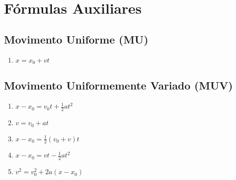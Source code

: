 \documentclass[12pt,a4paper,oneside]{article}
\begin{document}
\section{Fórmulas Auxiliares}

\subsection{Movimento Uniforme (MU)}

\begin{enumerate}
	\item $x = x_0 + vt$ 
\end{enumerate}

\subsection{Movimento Uniformemente Variado (MUV)}

\begin{enumerate}
	\item $x - x_0 = v_0t + \frac{1}{2}at^2$ 
	\item $v = v_0 + at$ 
	\item $x - x_0 = \frac{1}{2}(v_0 + v)t$ 
	\item $x - x_0 = vt - \frac{1}{2} a t^2$
	\item $v^2 = v_0^2 + 2a(x - x_0)$
\end{enumerate}
\end{document}
